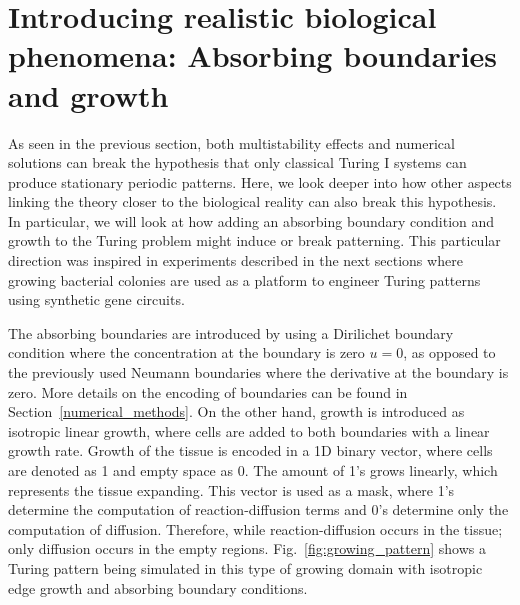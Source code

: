 \section{Introducing realistic biological phenomena: Absorbing boundaries and growth}
As seen in the previous section, both multistability effects and numerical solutions can break the hypothesis that only classical Turing I systems can produce stationary periodic patterns.
Here, we look deeper into how other aspects linking the theory closer to the biological reality can also break this hypothesis.
In particular, we will look at how adding an absorbing boundary condition and growth to the Turing problem might induce or break patterning.
This particular direction was inspired in experiments described in the next sections where growing bacterial colonies are used as a platform to engineer Turing patterns using synthetic gene circuits.

The absorbing boundaries are introduced by using a Dirilichet boundary condition where the concentration at the boundary is zero $u=0$, as opposed to the previously used Neumann boundaries where the derivative at the boundary is zero.
More details on the encoding of boundaries can be found in Section~\ref{numerical_methods}. %
On the other hand, growth is introduced as isotropic linear growth, where cells are added to both boundaries with a linear growth rate.
Growth of the tissue is encoded in a 1D binary vector, where cells are denoted as 1 and empty space as 0.
The amount of 1's grows linearly, which represents the tissue expanding.
This vector is used as a mask, where 1's determine the computation of reaction-diffusion terms and 0's determine only the computation of diffusion.
Therefore, while reaction-diffusion occurs in the tissue; only diffusion occurs in the empty regions.
Fig.~\ref{fig:growing_pattern} shows a Turing pattern being simulated in this type of growing domain with isotropic edge growth and absorbing boundary conditions.

